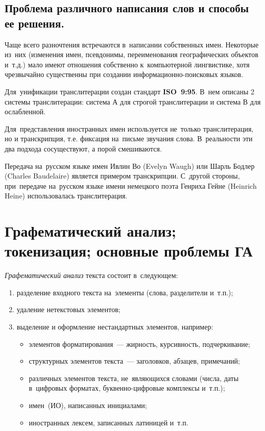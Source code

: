 \documentclass[12pt]{article}
\theoremstyle{definition}
\theoremstyle{remark}
\numberwithin{equation}{section}
\begin{document}
\subsection{Проблема различного написания слов и способы ее решения.}
Чаще всего разночтения встречаются в~написании собственных имен. Некоторые
из~них (изменения имен, псевдонимы, переименования географических объектов и~т.д.)
мало имеют отношения собственно к~компьютерной лингвистике, хотя чрезвычайно
существенны при создании информационно-поисковых языков.

Для~унификации транслитерации создан стандарт \textbf{ISO~9:95}. В~нем
описаны 2 системы транслитерации: система А для строгой транслитерации
и система В для ослабленной.

Для~представления иностранных имен используется не~только транслитерация,
но и транскрипция, т.е. фиксация на~письме звучания слова. В~реальности
эти два подхода сосуществуют, а порой смешиваются.

Передача на~русском языке имен Ивлин Во (Evelyn Waugh) или Шарль Бодлер
(Charles Baudelaire) является примером транскрипции. С~другой стороны,
при~передаче на~русском языке имени немецкого поэта Генриха Гейне (Heinrich
Heine) использовалась транслитерация.

\section{Графематический анализ; токенизация; основные проблемы ГА}
\textsl{Графематический анализ} текста состоит в~следующем:
\begin{enumerate}
    \item разделение входного текста на~элементы (слова,
    разделители и~т.п.);
    \item удаление нетекстовых элементов;
    \item выделение и оформление нестандартных элементов, например:
    \begin{itemize}
        \item элементов форматирования~--- жирность, курсивность,
        подчеркивание;
        \item структурных элементов текста~--- заголовков, абзацев,
        примечаний;
        \item различных элементов текста, не~являющихся словами
        (числа, даты в~цифровых форматах, буквенно-цифровые комплексы
        и~т.п.);
        \item имен~(ИО), написанных инициалами;
        \item иностранных лексем, записанных латиницей и~т.п.
    \end{itemize}
\end{enumerate}
\end{document}
